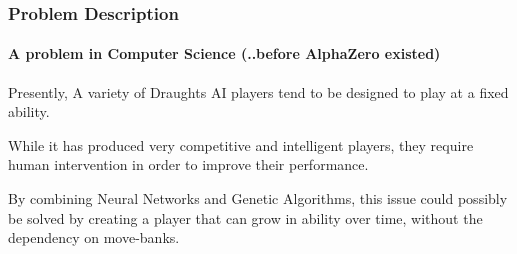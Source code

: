 \documentclass[aspectratio=169]{beamer}
\begin{document}
\begin{frame}
  \frametitle{Problem Description}
	\framesubtitle{A problem in Computer Science (..before AlphaZero existed)}
	\setlength{\parskip}{1.5em}

	Presently, A variety of Draughts AI players tend to be designed to play at a fixed ability.
	\par
	While it has produced very competitive and intelligent players, they require human  intervention in order to improve their performance.
	\par
	By combining Neural Networks and Genetic Algorithms, this issue could possibly be solved by creating a player that can grow in ability over time, without the dependency on move-banks.


\end{frame}



\end{document}
